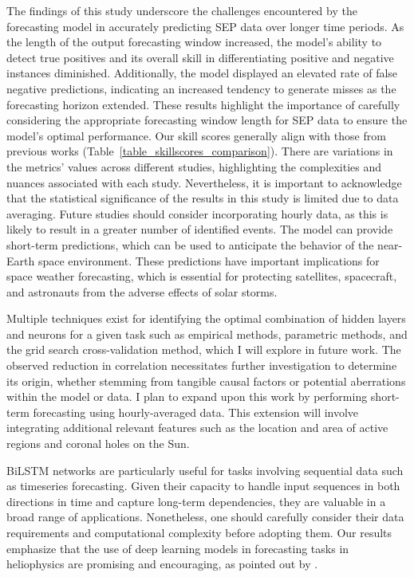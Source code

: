 The findings of this study underscore the challenges encountered by the forecasting model in accurately predicting SEP data over longer time periods. As the length of the output forecasting window increased, the model's ability to detect true positives and its overall skill in differentiating positive and negative instances diminished. Additionally, the model displayed an elevated rate of false negative predictions, indicating an increased tendency to generate misses as the forecasting horizon extended. These results highlight the importance of carefully considering the appropriate forecasting window length for SEP data to ensure the model's optimal performance. Our skill scores generally align with those from previous works (Table~\ref{table_skillscores_comparison}). There are variations in the metrics' values across different studies, highlighting the complexities and nuances associated with each study. Nevertheless, it is important to acknowledge that the statistical significance of the results in this study is limited due to data averaging. Future studies should consider incorporating hourly data, as this is likely to result in a greater number of identified events.
The model can provide short-term predictions, which can be used to anticipate the behavior of the near-Earth space environment. These predictions have important implications for space weather forecasting, which is essential for protecting satellites, spacecraft, and astronauts from the adverse effects of solar storms.

Multiple techniques exist for identifying the optimal combination of hidden layers and neurons for a given task such as empirical methods, parametric methods, and the grid search cross-validation method, which I will explore in future work.
The observed reduction in correlation necessitates further investigation to determine its origin, whether stemming from tangible causal factors or potential aberrations within the model or data.
I plan to expand upon this work by performing short-term forecasting using hourly-averaged data. This extension will involve integrating additional relevant features such as the location and area of active regions and coronal holes on the Sun.

BiLSTM networks are particularly useful for tasks involving sequential data such as timeseries forecasting. Given their capacity to handle input sequences in both directions in time and capture long-term dependencies, they are valuable in a broad range of applications. Nonetheless, one should carefully consider their data requirements and computational complexity before adopting them.
Our results emphasize that the use of deep learning models in forecasting tasks in heliophysics are promising and encouraging, as pointed out by \citet{zhang_lstm_2022}.

